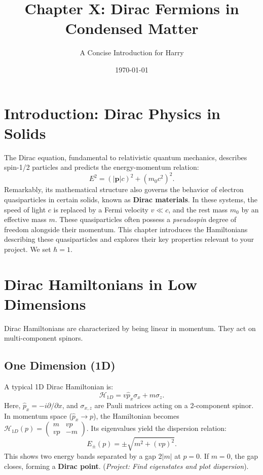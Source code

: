 \documentclass[11pt]{article}
\title{Chapter X: Dirac Fermions in Condensed Matter}
\author{A Concise Introduction for Harry}
\date{\today}
\newcommand{\pd}{\partial}
\newcommand{\Hc}{\mathcal{H}}       %
\begin{document}
\maketitle

\section{Introduction: Dirac Physics in Solids}

The Dirac equation, fundamental to relativistic quantum mechanics, describes spin-1/2 particles and predicts the energy-momentum relation:
\begin{equation}
E^2 = (|\mathbf{p}|c)^2 + (m_0 c^2)^2.
\label{eq:relativistic_energy}
\end{equation}
Remarkably, its mathematical structure also governs the behavior of electron quasiparticles in certain solids, known as \textbf{Dirac materials}. In these systems, the speed of light $c$ is replaced by a Fermi velocity $v \ll c$, and the rest mass $m_0$ by an effective mass $m$. These quasiparticles often possess a \emph{pseudospin} degree of freedom alongside their momentum. This chapter introduces the Hamiltonians describing these quasiparticles and explores their key properties relevant to your project. We set $\hbar = 1$.

\section{Dirac Hamiltonians in Low Dimensions}

Dirac Hamiltonians are characterized by being linear in momentum. They act on multi-component spinors.

\subsection{One Dimension (1D)}
A typical 1D Dirac Hamiltonian is:
\begin{equation}
\Hc_{1D} = v \hat{p}_x \sigma_x + m \sigma_z.
\label{eq:H_1D}
\end{equation}
Here, $\hat{p}_x = -i \pd/\pd x$, and $\sigma_{x,z}$ are Pauli matrices acting on a 2-component spinor. In momentum space ($\hat{p}_x \to p$), the Hamiltonian becomes $\Hc_{1D}(p) = \begin{pmatrix} m & v p \\ v p & -m \end{pmatrix}$. Its eigenvalues yield the dispersion relation:
\begin{equation}
E_{\pm}(p) = \pm \sqrt{m^2 + (v p)^2}.
\label{eq:dispersion_1D}
\end{equation}
This shows two energy bands separated by a gap $2|m|$ at $p=0$. If $m=0$, the gap closes, forming a \textbf{Dirac point}. (\textit{Project: Find eigenstates and plot dispersion}).
\end{document}
